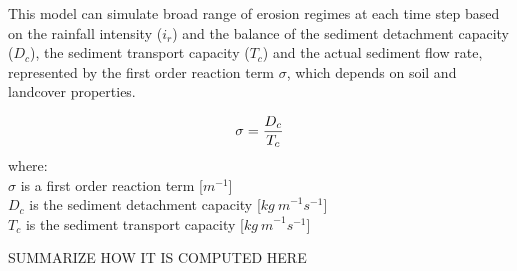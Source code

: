 \documentclass[gmd, manuscript]{copernicus}
\begin{document}

This model can simulate broad range of erosion regimes at each time step
based on the rainfall intensity ($i_r$)
and the balance of the sediment detachment capacity ($D_c$),
the sediment transport capacity ($T_c$) and the actual sediment flow rate,
represented by the first order reaction term $\sigma$,
which depends on soil and landcover properties.

\begin{equation}
\label{eq:regime}
\sigma = {D_c \over T_c}
\end{equation}
{\small
\noindent
where: \\
\noindent
\hspace*{0.5em} $\sigma$  is a first order reaction term [$\unit{m}^{-1}$]\\
\hspace*{0.5em} $D_c$ is the sediment detachment capacity [$\unit{kg~m}^{-1}s^{-1}$]\\
\hspace*{0.5em} $T_c$ is the sediment transport capacity [$\unit{kg~m}^{-1}s^{-1}$]\\
}

SUMMARIZE HOW IT IS COMPUTED HERE



\end{document}
